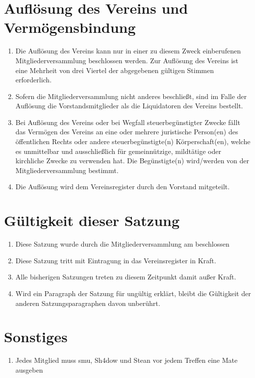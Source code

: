 \documentclass[a4paper,ngerman]{scrartcl}
\begin{document}

\section{Auflösung des Vereins und Vermögensbindung}
\begin{enumerate}
\item Die Auflösung des Vereins kann nur in einer zu diesem Zweck einberufenen Mitgliederversammlung beschlossen werden. Zur Auflösung des Vereins ist eine Mehrheit von drei Viertel der abgegebenen gültigen Stimmen erforderlich.
\item Sofern die Mitgliederversammlung nicht anderes beschließt, sind im Falle der Auflösung die Vorstandsmitglieder als die Liquidatoren des Vereins bestellt.
\item Bei Auflösung des Vereins oder bei Wegfall steuerbegünstigter Zwecke fällt das Vermögen des Vereins an eine oder mehrere juristische Person(en) des öffentlichen Rechts oder andere steuerbegünstigte(n) Körperschaft(en), welche es unmittelbar und ausschließlich für gemeinnützige, mildtätige oder kirchliche Zwecke zu verwenden hat. Die Begünstigte(n) wird/werden von der Mitgliederversammlung bestimmt.
\item Die Auflösung wird dem Vereinsregister durch den Vorstand mitgeteilt.
\end{enumerate}

\section{Gültigkeit dieser Satzung}
\begin{enumerate}
\item Diese Satzung wurde durch die Mitgliederversammlung am \MyDate beschlossen
\item Diese Satzung tritt mit Eintragung in das Vereinsregister in Kraft.
\item Alle bisherigen Satzungen treten zu diesem Zeitpunkt damit außer Kraft.
\item Wird ein Paragraph der Satzung für ungültig erklärt, bleibt die Gültigkeit der anderen Satzungsparagraphen davon unberührt.
\end{enumerate}

\section{Sonstiges}
\begin{enumerate}
\item Jedes Mitglied muss smu, Sh4dow und Stean vor jedem Treffen eine Mate ausgeben
\end{enumerate}
\end{document}
